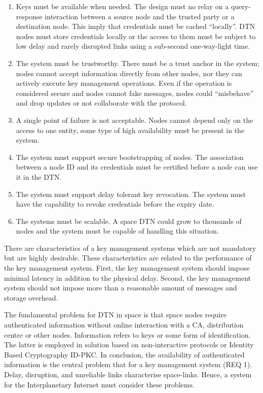 \begin{enumerate}
    \item Keys must be available when needed. The design must no relay on a query-response interaction between a source node and the trusted party or a destination node. This imply that credentials must be cached ``locally''. DTN nodes must store credentials locally or the access to them must be subject to low delay and rarely disrupted links using a sub-second one-way-light time.
    \item The system must be trustworthy. There must be a trust anchor in the system; nodes cannot accept information directly from other nodes, nor they can actively execute key management operations. Even if the operation is considered secure and nodes cannot fake messages, nodes could ``misbehave'' and drop updates or not collaborate with the protocol.
    \item A single point of failure is not acceptable. Nodes cannot depend only on the access to one entity,  some type of high availability must be present in the system.
    \item The system must support secure bootstrapping of nodes. The association between a node ID and its credentials must be certified before a node can use it in the DTN.
    \item The system must support delay tolerant key revocation. The system must have the capability to revoke credentials before the expiry date. 
    \item The systems must be scalable. A space DTN could grow to thousands of nodes and the system must be capable of handling this situation. 
\end{enumerate}


There are characteristics of a key management systems which are not mandatory but are highly desirable. These characteristics are related to the performance of the key management system. First, the key management system should impose minimal latency in addition to the physical delay. Second, the key management system should not impose more than a reasonable amount of messages and storage overhead. 
  

The fundamental problem for DTN in space is that space nodes require authenticated information without online interaction with a CA, distribution centre or other nodes. Information refers to keys or some form of identification. The latter is employed in solution based on non-interactive protocols or Identity Based Cryptography ID-PKC. In conclusion, the availability of authenticated information is the central problem that for a key management system (REQ 1). Delay, disruption, and unreliable links characterise space-links. Hence, a system for the Interplanetary Internet must consider these problems.


